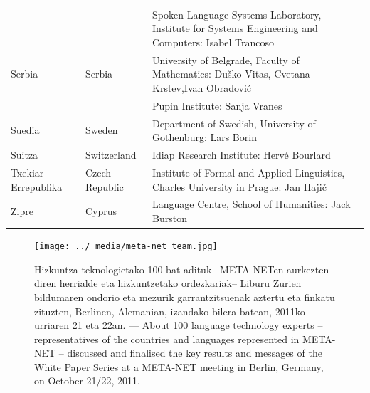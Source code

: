 \begin{longtable}{@{}llp{113mm}@{}}
  & & Spoken Language Systems Laboratory, Institute for Systems Engineering and Computers: Isabel Trancoso \\ \addlinespace
  Serbia & \textcolor{grey1}{Serbia} & University of Belgrade, Faculty of Mathematics: Duško Vitas, Cvetana Krstev,\newline Ivan Obradović \\ \addlinespace
  & & Pupin Institute: Sanja Vranes \\ \addlinespace  
  Suedia & \textcolor{grey1}{Sweden} & Department of Swedish, University of Gothenburg: Lars Borin \\ \addlinespace 
  Suitza & \textcolor{grey1}{Switzerland} & Idiap Research Institute: Hervé Bourlard \\ \addlinespace 
  Txekiar Errepublika & \textcolor{grey1}{Czech Republic} & Institute of Formal and Applied Linguistics, Charles University in Prague: Jan Hajič \\ \addlinespace
  Zipre & \textcolor{grey1}{Cyprus} & Language Centre, School of Humanities: Jack Burston
\end{longtable}
\normalsize

\renewcommand*{\figureformat}{}
\renewcommand*{\captionformat}{}

\begin{figure}[htbp]
  \center
  \texttt{[image: ../\_media/meta-net\_team.jpg]}
  \caption{Hizkuntza-teknologietako 100 bat adituk --META-NETen aurkezten diren herrialde eta hizkuntzetako ordezkariak-- Liburu Zurien bildumaren ondorio eta mezurik garrantzitsuenak aztertu eta finkatu zituzten, Berlinen, Alemanian, izandako bilera batean, 2011ko urriaren 21 eta 22an. ---
 \textcolor{grey1}{About 100 language technology experts -- representatives of the countries and languages represented in META-NET -- discussed and finalised the key results and messages of the White Paper Series at a META-NET meeting in Berlin, Germany, on October 21/22, 2011.}}
  \medskip
\end{figure}

\cleardoublepage

\label{whitepaperseries}

